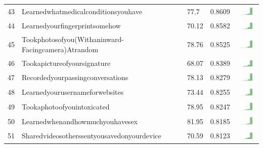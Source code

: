 \documentclass[a4paper,12pt]{article}
\begin{document}
\begin{longtable}{| p{0.5cm} | p{7cm} | p{1cm} |p{1cm} | c |}
43 & Learnedwhatmedicalconditionsyouhave & 77.7 & 0.8609&\includegraphics[width = 2cm, height = 0.5cm]{tables/learnedwhatmedicalconditionsyouhavecombined} \\ 
44 & Learnedyourfingerprintsomehow & 70.12 & 0.8582&\includegraphics[width = 2cm, height = 0.5cm]{tables/learnedyourfingerprintsomehowcombined} \\ 
45 & Tookphotosofyou(Withaninward-Facingcamera)Atrandom & 78.76 & 0.8525&\includegraphics[width = 2cm, height = 0.5cm]{tables/tookphotosofyou(withaninward-facingcamera)atrandomcombined} \\ 
46 & Tookapictureofyoursignature & 68.07 & 0.8389&\includegraphics[width = 2cm, height = 0.5cm]{tables/tookapictureofyoursignaturecombined} \\ 
47 & Recordedyourpassingconversations & 78.13 & 0.8279&\includegraphics[width = 2cm, height = 0.5cm]{tables/recordedyourpassingconversationscombined} \\ 
48 & Learnedyourusernameforwebsites & 73.44 & 0.8255&\includegraphics[width = 2cm, height = 0.5cm]{tables/learnedyourusernameforwebsitescombined} \\ 
49 & Tookaphotoofyouintoxicated & 78.95 & 0.8247&\includegraphics[width = 2cm, height = 0.5cm]{tables/tookaphotoofyouintoxicatedcombined} \\ 
50 & Learnedwhenandhowmuchyouhavesex & 81.95 & 0.8185&\includegraphics[width = 2cm, height = 0.5cm]{tables/learnedwhenandhowmuchyouhavesexcombined} \\ 
51 & Sharedvideosotherssentyousavedonyourdevice & 70.59 & 0.8123&\includegraphics[width = 2cm, height = 0.5cm]{tables/sharedvideosotherssentyousavedonyourdevicecombined} \\ 

\end{longtable}
\end{document}
